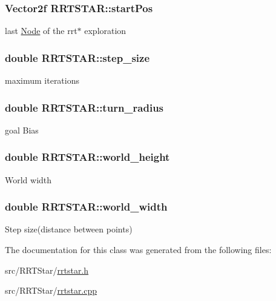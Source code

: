 \subsubsection[{\texorpdfstring{start\+Pos}{startPos}}]{\setlength{\rightskip}{0pt plus 5cm}Vector2f R\+R\+T\+S\+T\+A\+R\+::start\+Pos}\hypertarget{classRRTSTAR_ab3a0269ff354a27408ae48011a0e29f8}{}\label{classRRTSTAR_ab3a0269ff354a27408ae48011a0e29f8}
last \hyperlink{structNode}{Node} of the rrt$\ast$ exploration 
\subsubsection[{\texorpdfstring{step\+\_\+size}{step_size}}]{\setlength{\rightskip}{0pt plus 5cm}double R\+R\+T\+S\+T\+A\+R\+::step\+\_\+size}\hypertarget{classRRTSTAR_a6e49feee90b9dd0a780444ff07520512}{}\label{classRRTSTAR_a6e49feee90b9dd0a780444ff07520512}
maximum iterations 
\subsubsection[{\texorpdfstring{turn\+\_\+radius}{turn_radius}}]{\setlength{\rightskip}{0pt plus 5cm}double R\+R\+T\+S\+T\+A\+R\+::turn\+\_\+radius}\hypertarget{classRRTSTAR_a72f670ad016b3e6bbf4a429873362c11}{}\label{classRRTSTAR_a72f670ad016b3e6bbf4a429873362c11}
goal Bias 
\subsubsection[{\texorpdfstring{world\+\_\+height}{world_height}}]{\setlength{\rightskip}{0pt plus 5cm}double R\+R\+T\+S\+T\+A\+R\+::world\+\_\+height}\hypertarget{classRRTSTAR_a03ea0b6f54575f892d24553db558ce11}{}\label{classRRTSTAR_a03ea0b6f54575f892d24553db558ce11}
World width 
\subsubsection[{\texorpdfstring{world\+\_\+width}{world_width}}]{\setlength{\rightskip}{0pt plus 5cm}double R\+R\+T\+S\+T\+A\+R\+::world\+\_\+width}\hypertarget{classRRTSTAR_adc9c88a24560ab3a537ea374672b0121}{}\label{classRRTSTAR_adc9c88a24560ab3a537ea374672b0121}
Step size(distance between points) 

The documentation for this class was generated from the following files\+:\begin{DoxyCompactItemize}
\item 
src/\+R\+R\+T\+Star/\hyperlink{rrtstar_8h}{rrtstar.\+h}\item 
src/\+R\+R\+T\+Star/\hyperlink{rrtstar_8cpp}{rrtstar.\+cpp}\end{DoxyCompactItemize}
